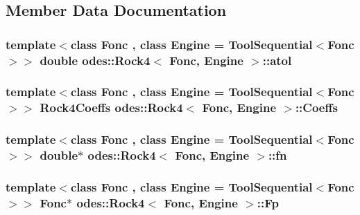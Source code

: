 \subsection{Member Data Documentation}
\hypertarget{classodes_1_1Rock4_a12e4452e4125f1349a279c107e84e7df}{
\subsubsection[{atol}]{\setlength{\rightskip}{0pt plus 5cm}template$<$class Fonc , class Engine  = Tool\-Sequential$<$\-Fonc$>$$>$ double {\bf odes\-::\-Rock4}$<$ Fonc, Engine $>$\-::atol\hspace{0.3cm}{\ttfamily [private]}}}\label{classodes_1_1Rock4_a12e4452e4125f1349a279c107e84e7df}
\hypertarget{classodes_1_1Rock4_a7ec9346124f5026ac28a8f0d6833238a}{
\subsubsection[{Coeffs}]{\setlength{\rightskip}{0pt plus 5cm}template$<$class Fonc , class Engine  = Tool\-Sequential$<$\-Fonc$>$$>$ {\bf Rock4\-Coeffs} {\bf odes\-::\-Rock4}$<$ Fonc, Engine $>$\-::Coeffs\hspace{0.3cm}{\ttfamily [private]}}}\label{classodes_1_1Rock4_a7ec9346124f5026ac28a8f0d6833238a}
\hypertarget{classodes_1_1Rock4_a27b36e1d22c1cece0f3e88ddd7a2dc5f}{
\subsubsection[{fn}]{\setlength{\rightskip}{0pt plus 5cm}template$<$class Fonc , class Engine  = Tool\-Sequential$<$\-Fonc$>$$>$ double$\ast$ {\bf odes\-::\-Rock4}$<$ Fonc, Engine $>$\-::fn\hspace{0.3cm}{\ttfamily [private]}}}\label{classodes_1_1Rock4_a27b36e1d22c1cece0f3e88ddd7a2dc5f}
\hypertarget{classodes_1_1Rock4_a898f96db31273a1c54bd589bd6929cfa}{
\subsubsection[{Fp}]{\setlength{\rightskip}{0pt plus 5cm}template$<$class Fonc , class Engine  = Tool\-Sequential$<$\-Fonc$>$$>$ Fonc$\ast$ {\bf odes\-::\-Rock4}$<$ Fonc, Engine $>$\-::Fp\hspace{0.3cm}{\ttfamily [private]}}}\label{classodes_1_1Rock4_a898f96db31273a1c54bd589bd6929cfa}
